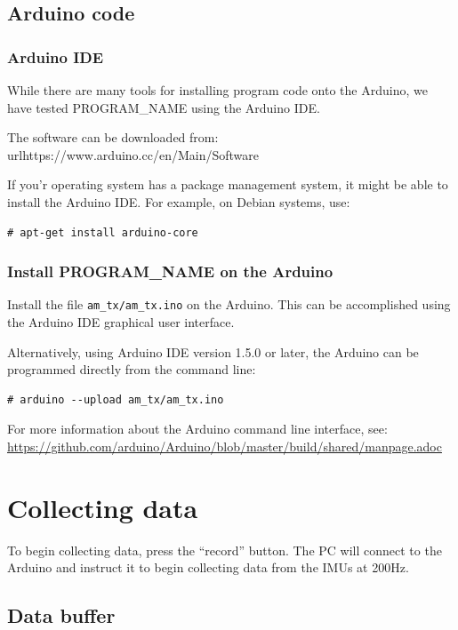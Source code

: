 \documentclass[11pt,letterpaper,article,oneside]{memoir}
\newcommand{\name}{PROGRAM\_NAME}
\begin{document}
\subsection{Arduino code}

\subsubsection{Arduino IDE}
While there are many tools for installing program code onto the Arduino, we have
tested \name{} using the Arduino IDE.

The software can be downloaded from:
url{https://www.arduino.cc/en/Main/Software}

If you'r operating system has a package management system, it might be able
to install the Arduino IDE. For example, on Debian systems, use:
\begin{verbatim}
# apt-get install arduino-core
\end{verbatim}

\subsubsection{Install \name{} on the Arduino}
\label{sec:installarduinocode}

Install the file \verb|am_tx/am_tx.ino| on the Arduino.
This can be accomplished using the Arduino IDE graphical user interface.

Alternatively, using Arduino IDE version 1.5.0 or later,
the Arduino can be programmed directly from the command line:

\begin{verbatim}
# arduino --upload am_tx/am_tx.ino
\end{verbatim}

For more information about the Arduino command line interface, see:
\url{https://github.com/arduino/Arduino/blob/master/build/shared/manpage.adoc}

\section{Collecting data}

To begin collecting data, press the ``record'' button.
The PC will connect to the Arduino and instruct it to begin collecting data from
the IMUs at 200Hz. 


\subsection{Data buffer}
\end{document}
